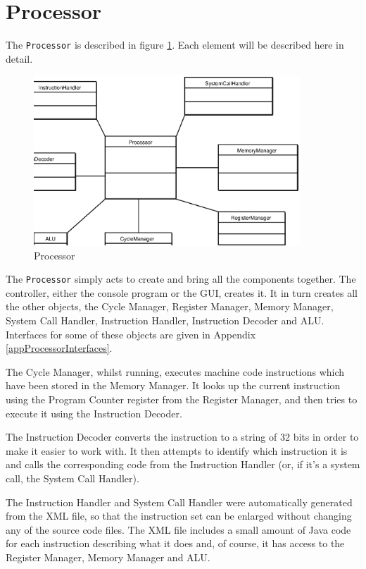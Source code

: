 \documentclass[12pt]{report}
\begin{document}
\section{Processor}

The {\tt Processor} is described in figure \ref{figProcessor}. Each element will be described here in detail.


\begin{figure}[htbp]
\begin{center}
\includegraphics[width=10cm]{processor.eps}
\end{center}
\caption{Processor}
\label{figProcessor}
\end{figure}

The {\tt Processor} simply acts to create and bring all the components together.  The controller, either the console program or the GUI, creates it.  It in turn creates all the other objects, the Cycle Manager, Register Manager, Memory Manager, System Call Handler, Instruction Handler, Instruction Decoder and ALU.  Interfaces for some of these objects are given in Appendix \ref{appProcessorInterfaces}.

The Cycle Manager, whilst running, executes machine code instructions which have been stored in the Memory Manager.  It looks up the current instruction using the Program Counter register from the Register Manager, and then tries to execute it using the Instruction Decoder.

The Instruction Decoder converts the instruction to a string of 32 bits in order to make it easier to work with.  It then attempts to identify which instruction it is and calls the corresponding code from the Instruction Handler (or, if it's a system call, the System Call Handler).

The Instruction Handler and System Call Handler were automatically generated from the XML file, so that the instruction set can be enlarged without changing any of the source code files.  The XML file includes a small amount of Java code for each instruction describing what it does and, of course, it has access to the Register Manager, Memory Manager and ALU.
\end{document}
